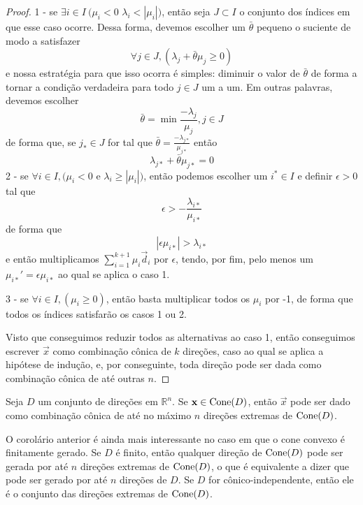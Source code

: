 \begin{thm:caratheodory cones}
\begin{proof}
   1 - se $\exists i \in I\ (\mu_i < 0$  $\lambda_i < |\mu_i|)$,
   então seja $J \subset I$ o conjunto dos índices em que esse caso ocorre.
   Dessa forma, devemos escolher um $\bar{\theta}$ pequeno o suciente
   de modo a satisfazer
   \begin{equation*}
     \forall j \in J, (\lambda_j + \bar{\theta} \mu_j \geq 0)
   \end{equation*}
   e nossa estratégia para que isso ocorra é simples: diminuir o valor de
   $\bar{\theta}$ de forma a tornar a condição verdadeira para todo $j \in J$
   um a um. Em outras palavras, devemos escolher
   \[
     \bar{\theta} = \min{\frac{-\lambda_j}{\mu_j}, j \in J}
   \]
   de forma que, se $j_{*} \in J$ for tal que $\bar{\theta} = \frac{-\lambda_{j*}}{\mu_{j*}}$
   então
   \[
     \lambda_{j*} + \bar{\theta} \mu_{j*} = 0
   \]
   2 - se $\forall i \in I, (\mu_i < 0$ e $\lambda_i \geq |\mu_i|)$,
   então podemos escolher um $i^{*} \in I$ e definir $\epsilon>0$ tal que
   \[
     \epsilon > -\frac{\lambda_{i*}}{\mu_{i*}}
   \]
   de forma que
   \[
     |\epsilon \mu_{i*}| > \lambda_{i*}
   \]
   e então multiplicamos $\sum_{i=1}^{k+1} \mu_i \vec{d}_i$ por $\epsilon$,
   tendo, por fim, pelo menos um $\mu_{i*}' = \epsilon \mu_{i*}$ ao qual se aplica o
   caso 1.

   3 - se $\forall i \in I, (\mu_i \geq 0)$, então basta multiplicar todos os
   $\mu_i$ por -1, de forma que todos os índices satisfarão os casos 1 ou 2.

   Visto que conseguimos reduzir todos as alternativas ao caso 1, então
   conseguimos escrever $\vec{x}$ como combinação cônica de $k$ direções, caso
   ao qual se aplica a hipótese de indução, e, por conseguinte,
   toda direção pode ser dada como combinação cônica de até
   outras $n$.
  \end{proof}
\end{thm:caratheodory cones}

\begin{cor:caratheodory cones}
  Seja $D$ um conjunto de direções em $\mathbb{R}^n$. Se $\mathbf{x} \in \mathrm{Cone}(D)$, então
  $\vec{x}$ pode ser dado como combinação cônica de até no máximo $n$ direções
  extremas de $\mathrm{Cone}(D)$.
\end{cor:caratheodory cones}

O corolário anterior é ainda mais interessante no caso em que o cone convexo
é finitamente gerado. Se $D$ é finito, então qualquer direção de
$\mathrm{Cone}(D)$ pode ser gerada por até $n$ direções extremas de $\mathrm{Cone}(D)$, o
que é equivalente a dizer que pode ser gerado por até $n$ direções de $D$.
Se $D$ for cônico-independente, então ele é o conjunto das direções
extremas de $\mathrm{Cone}(D)$.

